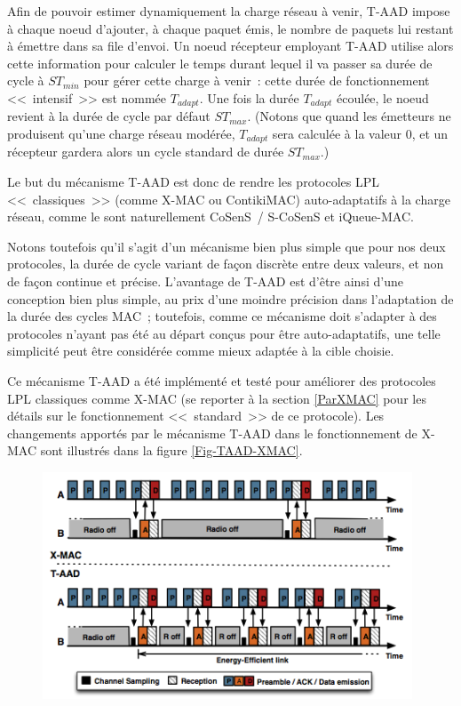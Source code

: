 Afin de pouvoir estimer dynamiquement la charge réseau à venir, T-AAD
impose à chaque noeud d'ajouter, à chaque paquet émis, le nombre de paquets
lui restant à émettre dans sa file d'envoi. Un noeud récepteur employant
T-AAD utilise alors cette information pour calculer le temps durant lequel
il va passer sa durée de cycle à $ST_{min}$ pour gérer cette charge à venir~:
cette durée de fonctionnement <<~intensif~>> est nommée $T_{adapt}$.
Une fois la durée $T_{adapt}$ écoulée, le noeud revient à la durée de cycle
par défaut $ST_{max}$. (Notons que quand les émetteurs ne produisent qu'une
charge réseau modérée, $T_{adapt}$ sera calculée à la valeur 0, et
un récepteur gardera alors un cycle standard de durée $ST_{max}$.)

Le but du mécanisme T-AAD est donc de rendre les protocoles LPL
<<~classiques~>> (comme X-MAC ou ContikiMAC) auto-adaptatifs à la charge
réseau, comme le sont naturellement CoSenS~/ S-CoSenS et iQueue-MAC.

Notons toutefois qu'il s'agit d'un mécanisme bien plus simple que pour
nos deux protocoles, la durée de cycle variant de façon discrète entre
deux valeurs, et non de façon continue et précise. L'avantage de T-AAD
est d'être ainsi d'une conception bien plus simple, au prix d'une
moindre précision dans l'adaptation de la durée des cycles MAC~;
toutefois, comme ce mécanisme doit s'adapter à des protocoles n'ayant
pas été au départ conçus pour être auto-adaptatifs, une telle simplicité
peut être considérée comme mieux adaptée à la cible choisie.

\medskip

Ce mécanisme T-AAD a été implémenté et testé pour améliorer des
protocoles LPL classiques comme X-MAC \cite{T-AAD} \cite{T-AAD-demo}
(se reporter à la section \vref{ParXMAC} pour les détails sur le
fonctionnement <<~standard~>> de ce protocole). Les changements
apportés par le mécanisme T-AAD dans le fonctionnement de X-MAC sont
illustrés dans la figure \vref{Fig-TAAD-XMAC}.

\begin{figure}[!htb]
\centering
\includegraphics[width=11cm]{images/ch3-t-aad-x-mac.png}
\label{Fig-TAAD-XMAC}
\end{figure}

